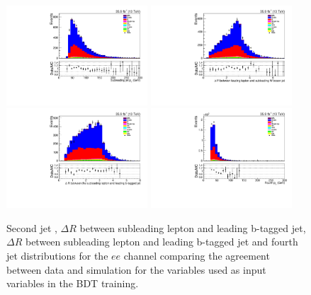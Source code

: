 \begin{figure}[htb]
\centering
\includegraphics[width=0.47\textwidth]{figs/background-estimation/plots/unblinded/prompt_ee_ttbarInc/secondJetPt_NPL_ee_wMass_ee.pdf}
\includegraphics[width=0.47\textwidth]{figs/background-estimation/plots/unblinded/prompt_ee_ttbarInc/zLep1Quark2DelR_NPL_ee_wMass_ee.pdf}
\\
\includegraphics[width=0.47\textwidth]{figs/background-estimation/plots/unblinded/prompt_ee_ttbarInc/zLep2BjetDelR_NPL_ee_wMass_ee.pdf}
\includegraphics[width=0.47\textwidth]{figs/background-estimation/plots/unblinded/prompt_ee_ttbarInc/fourthJetPt_NPL_ee_wMass_ee.pdf}
\caption{
Second jet \pt, $\Delta R$ between subleading lepton and leading b-tagged jet, $\Delta R$ between subleading lepton and leading b-tagged jet and fourth jet \pT distributions for the $ee$ channel comparing the agreement between data and simulation for the variables used as input variables in the BDT training.}
\label{fig:inputFeaturesDataSimAgreement3}
\end{figure}


